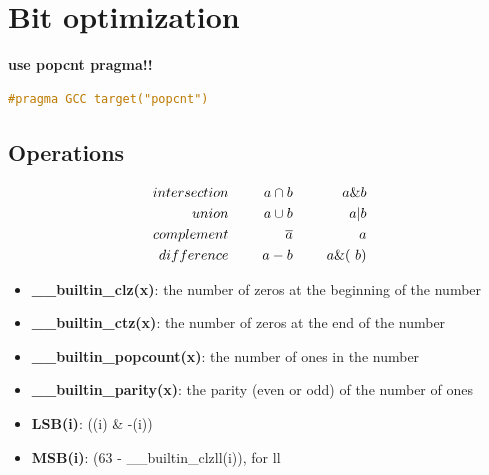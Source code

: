 
\section{Bit optimization}

    \textbf{use popcnt pragma!!}

    \begin{lstlisting}[language=c++]
    #pragma GCC target("popcnt")
    \end{lstlisting}

    \subsection{Operations}

    \begin{align*}
        intersection & \hspace{5mm} & a \cap b     & \hspace{5mm} &  a \& b \\
        union        & \hspace{5mm} & a  \cup b    & \hspace{5mm} &  a | b \\
        complement   & \hspace{5mm} & \overline{a} & \hspace{5mm} &  ~a \\
        difference   & \hspace{5mm} & a - b        & \hspace{5mm} &  a \& (~b) \\
    \end{align*}

    \begin{itemize} 
        \item \textbf{\_\_builtin\_clz(x)}: the number of zeros at the beginning of the number
        \item \textbf{\_\_builtin\_ctz(x)}: the number of zeros at the end of the number
        \item \textbf{\_\_builtin\_popcount(x)}: the number of ones in the number
        \item \textbf{\_\_builtin\_parity(x)}: the parity (even or odd) of the number of ones

        \item \textbf{LSB(i)}: ((i) \& -(i))
        \item \textbf{MSB(i)}: (63 - \_\_builtin\_clzll(i)), for ll
    \end{itemize}
    
